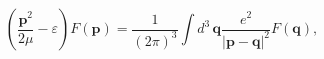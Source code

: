 \begin{equation}
\left( \frac{\mathbf{p}^{2}}{2\mu }-\varepsilon \right) F(\mathbf{p})=\frac{1%
}{(2\pi )^{3}}\int d^{3} \, \mathbf{q}\frac{e^{2}}{\left| \mathbf{p-q}\right|
^{2}}F(\mathbf{q}),
\end{equation}

